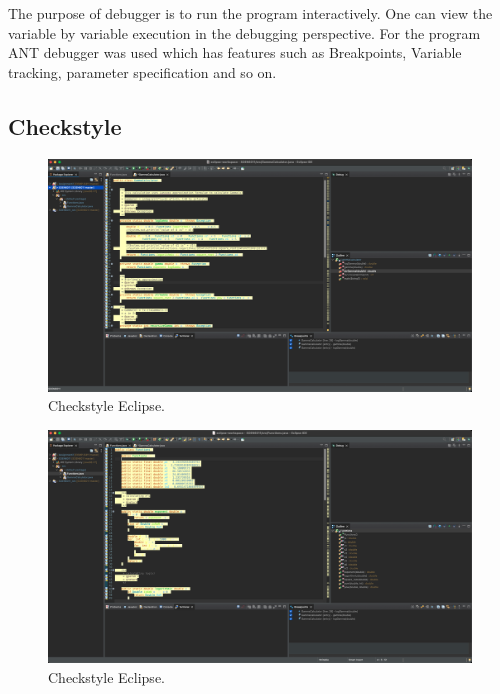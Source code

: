 \documentclass[12pt]{report}
\begin{document}
The purpose of debugger is to run the program interactively. One can view the variable by variable execution in the debugging perspective. For the program ANT debugger was used which has features such as Breakpoints, Variable tracking, parameter specification and so on.

\newpage
\subsection{Checkstyle}

\begin{figure}[h!]
    \begin{center}
    \includegraphics[width=0.7\linewidth]{Checkstyle1.png}
    \end{center}
    \caption{Checkstyle Eclipse.}
 \end{figure}
 
 \begin{figure}[h!]
    \begin{center}
    \includegraphics[width=0.7\linewidth]{Checkstyle2.png}
    \end{center}
    \caption{Checkstyle Eclipse.}
 \end{figure}
\end{document}
